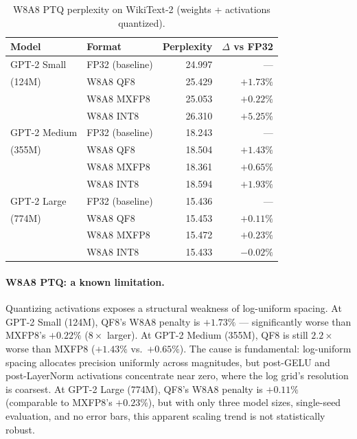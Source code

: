 \documentclass[11pt,letterpaper]{article}
\theoremstyle{definition}
\theoremstyle{remark}
\begin{document}
\begin{table}[ht]
\centering
\caption{W8A8 PTQ perplexity on WikiText-2 (weights + activations quantized).}
\label{tab:ptq-w8a8}
\begin{tabular}{@{}llrr@{}}
\toprule
Model & Format & Perplexity & $\Delta$ vs FP32 \\
\midrule
GPT-2 Small  & FP32 (baseline)   & 24.997 & ---        \\
(124M)       & W8A8 QF8          & 25.429 & $+1.73\%$  \\
             & W8A8 MXFP8        & 25.053 & $+0.22\%$  \\
             & W8A8 INT8         & 26.310 & $+5.25\%$  \\
\midrule
GPT-2 Medium & FP32 (baseline)   & 18.243 & ---        \\
(355M)       & W8A8 QF8          & 18.504 & $+1.43\%$  \\
             & W8A8 MXFP8        & 18.361 & $+0.65\%$  \\
             & W8A8 INT8         & 18.594 & $+1.93\%$  \\
\midrule
GPT-2 Large  & FP32 (baseline)   & 15.436 & ---        \\
(774M)       & W8A8 QF8          & 15.453 & $+0.11\%$  \\
             & W8A8 MXFP8        & 15.472 & $+0.23\%$  \\
             & W8A8 INT8         & 15.433 & $-0.02\%$  \\
\bottomrule
\end{tabular}
\end{table}

\paragraph{W8A8 PTQ: a known limitation.}
Quantizing activations exposes a structural weakness of log-uniform spacing.
At GPT-2 Small (124M), QF8's W8A8 penalty is $+1.73\%$ --- significantly worse
than MXFP8's $+0.22\%$ ($8\times$ larger).
At GPT-2 Medium (355M), QF8 is still $2.2\times$ worse than MXFP8 ($+1.43\%$
vs.\ $+0.65\%$).
The cause is fundamental: log-uniform spacing allocates precision uniformly
across magnitudes, but post-GELU and post-LayerNorm activations concentrate near
zero, where the log grid's resolution is coarsest.
At GPT-2 Large (774M), QF8's W8A8 penalty is $+0.11\%$
(comparable to MXFP8's $+0.23\%$), but with only three model sizes,
single-seed evaluation, and no error bars, this apparent scaling trend is not
statistically robust.
\end{document}
